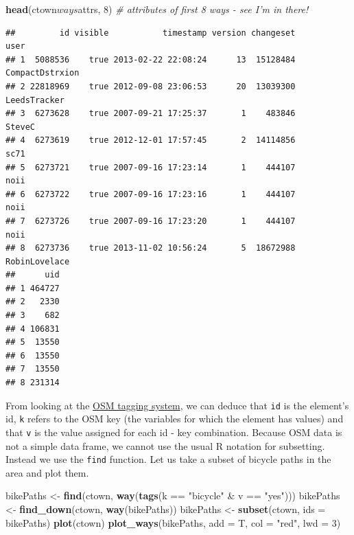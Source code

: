 \documentclass[]{article}
\newenvironment{Shaded}{}{}
\newcommand{\KeywordTok}[1]{\textcolor[rgb]{0.00,0.44,0.13}{\textbf{{#1}}}}
\newcommand{\DataTypeTok}[1]{\textcolor[rgb]{0.56,0.13,0.00}{{#1}}}
\newcommand{\DecValTok}[1]{\textcolor[rgb]{0.25,0.63,0.44}{{#1}}}
\newcommand{\StringTok}[1]{\textcolor[rgb]{0.25,0.44,0.63}{{#1}}}
\newcommand{\CommentTok}[1]{\textcolor[rgb]{0.38,0.63,0.69}{\textit{{#1}}}}
\newcommand{\NormalTok}[1]{{#1}}
\begin{document}
\begin{Shaded}
\begin{Highlighting}[]
\KeywordTok{head}\NormalTok{(ctown$ways$attrs, }\DecValTok{8}\NormalTok{)  }\CommentTok{# attributes of first 8 ways - see I'm in there!}
\end{Highlighting}
\end{Shaded}

\begin{verbatim}
##         id visible           timestamp version changeset            user
## 1  5088536    true 2013-02-22 22:08:24      13  15128484 CompactDstrxion
## 2 22818969    true 2012-09-08 23:06:53      20  13039300    LeedsTracker
## 3  6273628    true 2007-09-21 17:25:37       1    483846          SteveC
## 4  6273619    true 2012-12-01 17:57:45       2  14114856            sc71
## 5  6273721    true 2007-09-16 17:23:14       1    444107            noii
## 6  6273722    true 2007-09-16 17:23:16       1    444107            noii
## 7  6273726    true 2007-09-16 17:23:20       1    444107            noii
## 8  6273736    true 2013-11-02 10:56:24       5  18672988   RobinLovelace
##      uid
## 1 464727
## 2   2330
## 3    682
## 4 106831
## 5  13550
## 6  13550
## 7  13550
## 8 231314
\end{verbatim}

From looking at the \href{http://wiki.openstreetmap.org/wiki/Tags}{OSM
tagging system}, we can deduce that \texttt{id} is the element's id,
\texttt{k} refers to the OSM key (the variables for which the element
has values) and that \texttt{v} is the value assigned for each id - key
combination. Because OSM data is not a simple data frame, we cannot use
the usual R notation for subsetting. Instead we use the \texttt{find}
function. Let us take a subset of bicycle paths in the area and plot
them.

\begin{Shaded}
\begin{Highlighting}[]
\NormalTok{bikePaths <- }\KeywordTok{find}\NormalTok{(ctown, }\KeywordTok{way}\NormalTok{(}\KeywordTok{tags}\NormalTok{(k == }\StringTok{"bicycle"} \NormalTok{& v == }\StringTok{"yes"}\NormalTok{)))}
\NormalTok{bikePaths <- }\KeywordTok{find_down}\NormalTok{(ctown, }\KeywordTok{way}\NormalTok{(bikePaths))}
\NormalTok{bikePaths <- }\KeywordTok{subset}\NormalTok{(ctown, }\DataTypeTok{ids =} \NormalTok{bikePaths)}
\KeywordTok{plot}\NormalTok{(ctown)}
\KeywordTok{plot_ways}\NormalTok{(bikePaths, }\DataTypeTok{add =} \NormalTok{T, }\DataTypeTok{col =} \StringTok{"red"}\NormalTok{, }\DataTypeTok{lwd =} \DecValTok{3}\NormalTok{)}
\end{Highlighting}
\end{Shaded}
\end{document}
